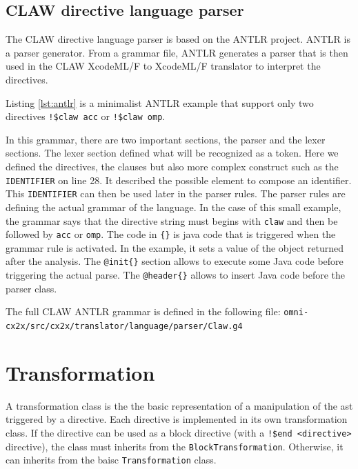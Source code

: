 \documentclass[a4paper, 11pt]{report}
\def\xcodeml{XcodeML/F\xspace}
\begin{document}
\section{CLAW directive language parser}
The CLAW directive language parser is based on the ANTLR project. ANTLR is a parser generator. From a grammar file, ANTLR generates a parser that is then used in the CLAW \xcodeml to \xcodeml translator to interpret the directives. 



Listing \ref{lst:antlr} is a minimalist ANTLR example that support only two directives \lstinline|!$claw acc| or \lstinline|!$claw omp|.

In this grammar, there are two important sections, the parser and the lexer sections. The lexer section defined what will be recognized as a token. Here we defined the directives, the clauses but also more complex construct such as the \lstinline|IDENTIFIER| on line 28. It described the possible element to compose an identifier. This \lstinline|IDENTIFIER| can then be used later in the parser rules. 
The parser rules are defining the actual grammar of the language. In the case of this small example, the grammar says that the directive string must begins with \lstinline|claw| and then be followed by \lstinline|acc| or \lstinline|omp|. The code in \lstinline|{}| is java code that is triggered when the grammar rule is activated. In the example, it sets a value of the object returned after the analysis.
The \lstinline|@init{}| section allows to execute some Java code before triggering the actual parse. The \lstinline|@header{}| allows to insert Java code before the parser class.

The full CLAW ANTLR grammar is defined in the following file: \lstinline|omni-cx2x/src/cx2x/translator/language/parser/Claw.g4|

\chapter{Transformation}
A transformation class is the the basic representation of a manipulation of the \gls{ast} triggered by a directive. Each directive is implemented in its own transformation class. If the directive can be used as a block directive (with a \lstinline|!$end <directive>| directive), the class must inherits from the \lstinline!BlockTransformation!. Otherwise, it can inherits from the baisc \lstinline!Transformation! class.
\end{document}
